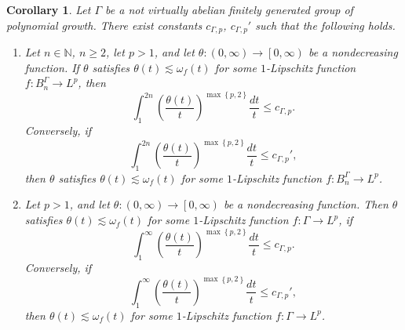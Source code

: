 \documentclass[11pt,reqno]{amsart}
\newtheorem{corollary}[theorem]{Corollary}
\newcommand{\1}{\mathbf 1}
\begin{document}
\begin{corollary}\label{cor:growth-function-char}
Let $\Gamma$ be a not virtually abelian finitely generated group of polynomial growth. There exist constants $c_{\Gamma,p}$, $c_{\Gamma,p}'$ such that the following holds.
\begin{enumerate}
\item
Let $n\in \mathbb{N}$, $n\ge 2$, let $p>1$, and let $\theta:\left(0,\infty\right)\to \left[0,\infty\right)$ be a nondecreasing function. If $\theta$ satisfies $\theta\left(t\right)\lesssim \omega_f\left(t\right)$ for some $1$-Lipschitz function $f:B^\Gamma_n\to L^p$, then
\[
\int_1^{2n} \left(\frac{\theta\left(t\right)}{t}\right)^{\max\left\{p,2\right\}}\frac{dt}{t}\le c_{\Gamma,p}.
\]
Conversely, if
\[
\int_1^{2n} \left(\frac{\theta\left(t\right)}{t}\right)^{\max\left\{p,2\right\}}\frac{dt}{t}\le c_{\Gamma,p}',
\]
then $\theta$ satisfies $\theta\left(t\right)\lesssim \omega_f\left(t\right)$ for some $1$-Lipschitz function $f:B^\Gamma_n\to L^p$.

\item
Let $p>1$, and let $\theta:\left(0,\infty\right)\to \left[0,\infty\right)$ be a nondecreasing function. Then $\theta$ satisfies $\theta\left(t\right)\lesssim \omega_f\left(t\right)$ for some $1$-Lipschitz function $f:\Gamma\to L^p$, if
\[
\int_1^{\infty} \left(\frac{\theta\left(t\right)}{t}\right)^{\max\left\{p,2\right\}}\frac{dt}{t}\le c_{\Gamma,p}.
\]
Conversely, if
\[
\int_1^{\infty} \left(\frac{\theta\left(t\right)}{t}\right)^{\max\left\{p,2\right\}}\frac{dt}{t}\le c_{\Gamma,p}',
\]
then $\theta\left(t\right)\lesssim \omega_f\left(t\right)$ for some $1$-Lipschitz function $f:\Gamma\to L^p$.
\end{enumerate}
\end{corollary}
\end{document}

